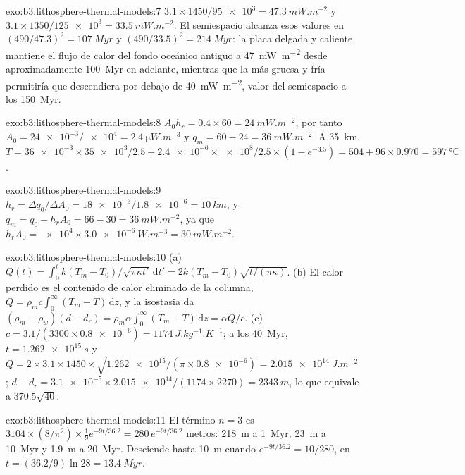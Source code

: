 \begin{solution}{exo:b3:lithosphere-thermal-models:7}
$3.1\times1450/\num{95e3} = \qty{47.3}{mW.m^{-2}}$ y $3.1\times1350/\num{125e3}
= \qty{33.5}{mW.m^{-2}}$. El semiespacio alcanza esos valores en $(490/47.3)^2 =
\qty{107}{Myr}$ y $(490/33.5)^2 = \qty{214}{Myr}$: la placa delgada y caliente mantiene
el flujo de calor del fondo oceánico antiguo a \qty{47}{mW.m^{-2}} desde aproximadamente \qty{100}{Myr}
en adelante, mientras que la más gruesa y fría permitiría que descendiera por debajo de
\qty{40}{mW.m^{-2}}, valor del semiespacio a los \qty{150}{Myr}.
\end{solution}

\begin{solution}{exo:b3:lithosphere-thermal-models:8}
$A_0h_r = 0.4\times60 = \qty{24}{mW.m^{-2}}$, por tanto $A_0 =
\num{24e-3}/\num{e4} = \qty{2.4}{\micro W.m^{-3}}$ y $q_m = 60 - 24 =
\qty{36}{mW.m^{-2}}$. A \qty{35}{km}, $T = \num{36e-3}\times\num{35e3}/2.5 +
\num{2.4e-6}\times\num{e8}/2.5\times(1 - e^{-3.5}) = 504 + 96\times0.970 =
\qty{597}{\celsius}$.
\end{solution}

\begin{solution}{exo:b3:lithosphere-thermal-models:9}
$h_r = \Delta q_0/\Delta A_0 = \num{18e-3}/\num{1.8e-6} = \qty{10}{km}$, y
$q_m = q_0 - h_rA_0 = 66 - 30 = \qty{36}{mW.m^{-2}}$, ya que $h_rA_0 =
\num{e4}\times\qty{3.0e-6}{W.m^{-3}} = \qty{30}{mW.m^{-2}}$.
\end{solution}

\begin{solution}{exo:b3:lithosphere-thermal-models:10}
(a) $Q(t) = \int_0^tk(T_m - T_0)/\sqrt{\pi\kappa t'}\,\mathrm dt' =
2k(T_m - T_0)\sqrt{t/(\pi\kappa)}$. (b) El calor perdido es el contenido de calor
eliminado de la columna, $Q = \rho_mc\int_0^\infty(T_m - T)\,\mathrm dz$, y
la isostasia da $(\rho_m - \rho_w)(d - d_r) = \rho_m\alpha\int_0^\infty(T_m -
T)\,\mathrm dz = \alpha Q/c$. (c) $c = 3.1/(3300\times\num{0.8e-6}) =
\qty{1174}{J.kg^{-1}.K^{-1}}$; a los \qty{40}{Myr}, $t = \qty{1.262e15}{s}$ y
$Q = 2\times3.1\times1450\times\sqrt{\num{1.262e15}/(\pi\times\num{0.8e-6})} =
\qty{2.015e14}{J.m^{-2}}$; $d - d_r = \num{3.1e-5}\times\num{2.015e14}/
(1174\times2270) = \qty{2343}{m}$, lo que equivale a $370.5\sqrt{40}$.
\end{solution}

\begin{solution}{exo:b3:lithosphere-thermal-models:11}
El término $n = 3$ es $3104\times(8/\pi^2)\times\tfrac19e^{-9t/36.2} =
280\,e^{-9t/36.2}$ metros: \qty{218}{m} a \qty{1}{Myr}, \qty{23}{m} a
\qty{10}{Myr} y \qty{1.9}{m} a \qty{20}{Myr}. Desciende hasta \qty{10}{m} cuando
$e^{-9t/36.2} = 10/280$, en $t = (36.2/9)\ln28 = \qty{13.4}{Myr}$.
\end{solution}

